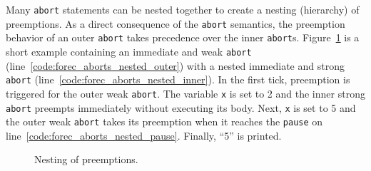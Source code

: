 Many \verb$abort$ statements can be nested together to create 
a nesting (hierarchy) of preemptions.
As a direct consequence of the \verb$abort$ semantics, the
preemption behavior of an outer \verb$abort$ takes precedence 
over the inner \verb$abort$s. Figure~\ref{fig:forec_aborts_nested}
is a short example containing an immediate and weak
\verb$abort$ (line~\ref{code:forec_aborts_nested_outer}) 
with a nested immediate and strong \verb$abort$
(line~\ref{code:forec_aborts_nested_inner}).
In the first tick, preemption is triggered for the outer
weak \verb$abort$. The variable \verb$x$ is set to 2
and the inner strong \verb$abort$ preempts
immediately without executing its body. Next, \verb$x$ is set to 5 and the 
outer weak \verb$abort$ takes its preemption when 
it reaches the \verb$pause$ on line~\ref{code:forec_aborts_nested_pause}. 
Finally, ``5'' is printed.

\begin{figure}
	\centering

	\begin{minipage}[t]{0.75\columnwidth}
		
	\end{minipage}

	\caption{Nesting of preemptions.}
	\label{fig:forec_aborts_nested}
\end{figure}



